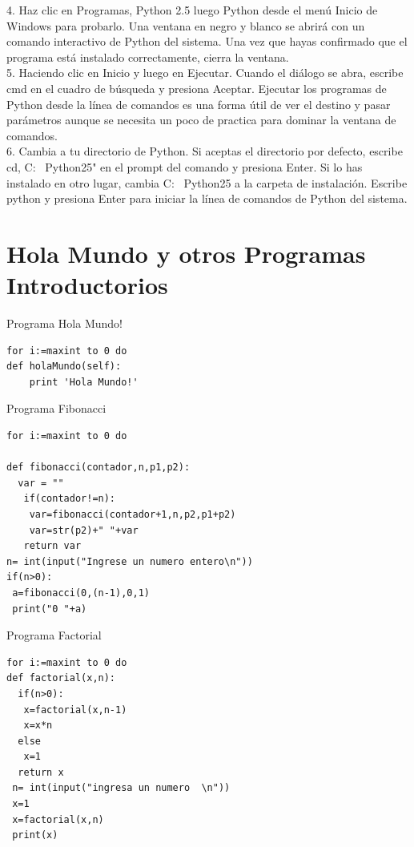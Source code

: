 \documentclass[11pt]{article} %
\begin{document}
4.	Haz clic en Programas, Python 2.5 luego Python desde el menú Inicio de Windows para probarlo. Una ventana en negro y blanco se abrirá con un comando interactivo de Python del sistema. Una vez que hayas confirmado que el programa está instalado correctamente, cierra la ventana.\\

5.	Haciendo clic en Inicio y luego en Ejecutar. Cuando el diálogo se abra, escribe cmd en el cuadro de búsqueda y presiona Aceptar. Ejecutar los programas de Python desde la línea de comandos es una forma útil de ver el destino y pasar parámetros aunque se necesita un poco de practica para dominar la ventana de comandos.\\

6.	Cambia a tu directorio de Python. Si aceptas el directorio por defecto, escribe cd,  C: \ Python25" en el prompt del comando y presiona Enter. Si lo has instalado en otro lugar, cambia C: \ Python25 a la carpeta de instalación. Escribe python y presiona Enter para iniciar la línea de comandos de Python del sistema.\\


\section{Hola Mundo y otros Programas Introductorios}

\lstset{language=Python}          %


Programa Hola Mundo!
\begin{lstlisting}[frame=single]  % Start your code-block
for i:=maxint to 0 do
def holaMundo(self):
	print 'Hola Mundo!'
\end{lstlisting}

Programa Fibonacci
\begin{lstlisting}[frame=single]  % Start your code-block
for i:=maxint to 0 do

def fibonacci(contador,n,p1,p2):
  var = ""
   if(contador!=n):
   	var=fibonacci(contador+1,n,p2,p1+p2)
   	var=str(p2)+" "+var
   return var
n= int(input("Ingrese un numero entero\n"))
if(n>0):
 a=fibonacci(0,(n-1),0,1)
 print("0 "+a)  
\end{lstlisting}

Programa Factorial
\begin{lstlisting}[frame=single]  % Start your code-block
for i:=maxint to 0 do
def factorial(x,n):
  if(n>0):
   x=factorial(x,n-1)
   x=x*n
  else
   x=1
  return x
 n= int(input("ingresa un numero  \n"))
 x=1
 x=factorial(x,n)
 print(x)
\end{lstlisting}
\end{document}
